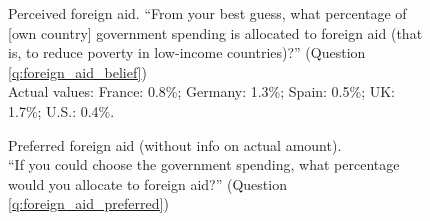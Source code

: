 \begin{figure}[h!]
    \caption[Perceived foreign aid]{Perceived foreign aid. ``From your best guess, what percentage of [own country] government spending is allocated to foreign aid (that is, to reduce poverty in low-income countries)?'' (Question \ref{q:foreign_aid_belief}) \\ Actual values: France: 0.8\%; Germany: 1.3\%; Spain: 0.5\%; UK: 1.7\%; U.S.: 0.4\%.}\label{fig:foreign_aid_belief}
\end{figure}

\begin{figure}[h!]
    \caption[Preferred foreign aid (without info on actual amount)]{Preferred foreign aid (without info on actual amount). \\ ``If you could choose the government spending, what percentage would you allocate
    to foreign aid?'' (Question \ref{q:foreign_aid_preferred})}\label{fig:foreign_aid_preferred_no_info}
\end{figure}

